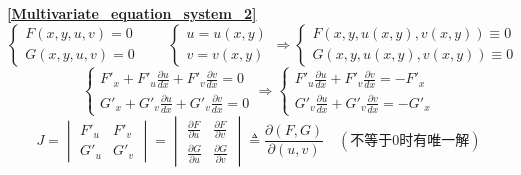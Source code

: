 \textbf{\large \ref{Multivariate_equation_system_2}}\\
$$\begin{cases}
	F(x,y,u,v)=0\\
	G(x,y,u,v)=0
\end{cases}\qquad\begin{cases}
	u=u(x,y)\\
	v=v(x,y)
\end{cases}\Rightarrow\begin{cases}
	F(x,y,u(x,y),v(x,y))\equiv0\\
	G(x,y,u(x,y),v(x,y))\equiv0
\end{cases}$$
$$\begin{cases}
	F'_x+F'_u\frac{\partial u}{dx}+F'_v\frac{\partial v}{dx}=0\\
	G'_x+G'_v\frac{\partial u}{dx}+G'_v\frac{\partial v}{dx}=0	
\end{cases}\Rightarrow\begin{cases}
	F'_u\frac{\partial u}{dx}+F'_v\frac{\partial v}{dx}=-F'_x\\
	G'_v\frac{\partial u}{dx}+G'_v\frac{\partial v}{dx}=-G'_x	
\end{cases}$$
$$J=\begin{vmatrix}
	F'_u & F'_v\\
	G'_u & G'_v
\end{vmatrix}=\begin{vmatrix}
	\frac{\partial F}{\partial u} & \frac{\partial F}{\partial v}\\
	\frac{\partial G}{\partial u} & \frac{\partial G}{\partial v}
\end{vmatrix}\triangleq\frac{\partial(F,G)}{\partial(u,v)}\quad(\mbox{不等于0时有唯一解})$$
